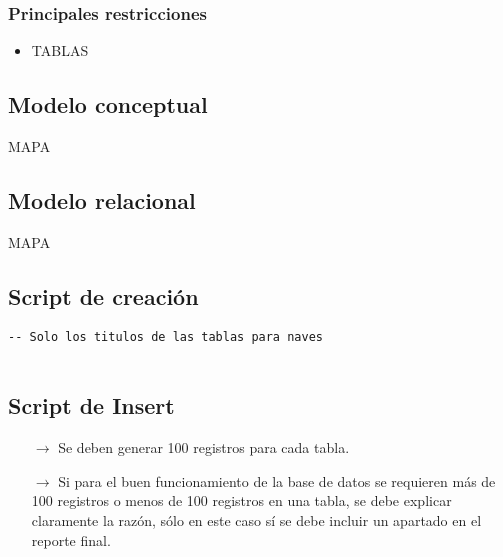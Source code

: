\subsubsection*{Principales restricciones}
\begin{itemize}
    \item TABLAS
\end{itemize}

  
\subsection{Modelo conceptual}
\begin{center}
    MAPA
\end{center}


\subsection{Modelo relacional}
\begin{center}
  MAPA
\end{center}


\subsection{Script de creación}
\begin{lstlisting}[caption={Tablas para la BdDatos}, label={lst:sql_estadios}]
    -- Solo los titulos de las tablas para naves    
   
\end{lstlisting}

\subsection{Script de Insert}
\begin{itemize}
    \item[$\rightarrow$] Se deben generar 100 registros para cada tabla.
    \item[$\rightarrow$] Si para el buen funcionamiento de la base de datos se requieren más de 100 registros o
            menos de 100 registros en una tabla, se debe explicar claramente la razón, sólo en este caso
            sí se debe incluir un apartado en el reporte final.
\end{itemize}

